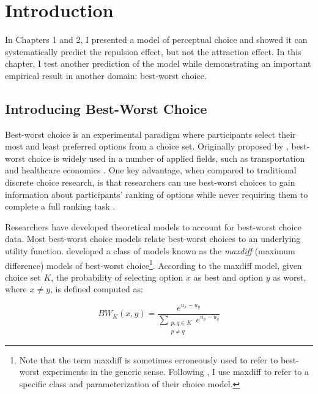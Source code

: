 \section{Introduction}

In Chapters 1 and 2, I presented a model of perceptual choice and showed it can systematically predict the repulsion effect, but not the attraction effect. In this chapter, I test another prediction of the model while demonstrating an important empirical result in another domain: best-worst choice.

\subsection{Introducing Best-Worst Choice}

Best-worst choice is an experimental paradigm where participants select their most and least preferred options from a choice set. Originally proposed by \textcite{finn1992determining}, best-worst choice is widely used in a number of applied fields, such as transportation \parencite{beck2016best} and healthcare economics \parencite{cheung2016using,flynn2007best,muhlbacher2016experimental}. One key advantage, when compared to traditional discrete choice research, is that researchers can use best-worst choices to gain information about participants' ranking of options while never requiring them to complete a full ranking task \parencite{marleyProbabilisticModelsBest2005}.

Researchers have developed theoretical models to account for best-worst choice data. Most best-worst choice models relate best-worst choices to an underlying utility function. \textcite{marleyProbabilisticModelsBest2005} developed a class of models known as the \textit{maxdiff} (maximum difference) models of best-worst choice\footnote{Note that the term maxdiff is sometimes erroneously used to refer to best-worst experiments in the generic sense. Following \textcite{marleyProbabilisticModelsBest2005}, I use maxdiff to refer to a specific class and parameterization of their choice model.}. According to the maxdiff model, given choice set $K$, the probability of selecting option $x$ as best and option $y$ as worst, where $x \neq y$, is defined computed as:

\begin{equation}
   BW_{K}(x,y)=\frac{e^{u_{x}-u_{y}}}{\sum_{\substack{{p,q}\in K\\p \neq q}} e^{u_{p}-u_{q}}}   
   \label{eqn:maxdiff_equation}
\end{equation}

